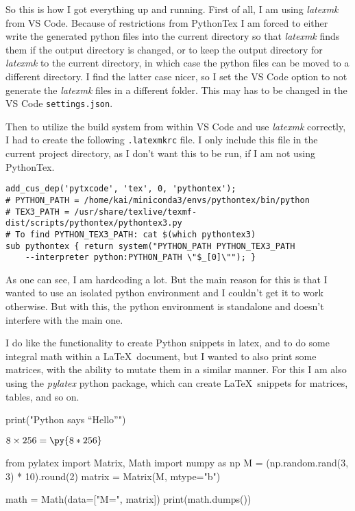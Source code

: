 \documentclass{article}
\newcommand{\pymultiply}[2]{\py{#1*#2}}
\begin{document}
So this is how I got everything up and running.
First of all, I am using \emph{latexmk} from VS Code.
Because of restrictions from PythonTex I am forced to
either write the generated python files into the current
directory so that \emph{latexmk} finds them if the output directory
is changed, or to keep the output directory for \emph{latexmk}
to the current directory, in which case the python files can be
moved to a different directory. I find the latter case nicer,
so I set the VS Code option to not generate the \emph{latexmk} 
files in a different folder. This may has to be changed
in the VS Code \texttt{settings.json}.

Then to utilize the build system from within VS Code and use
\emph{latexmk} correctly, I had to create the following
\texttt{.latexmkrc} file. I only include this file in the
current project directory, as I don't want this to be run, if
I am not using PythonTex.

{\small
\begin{verbatim}
add_cus_dep('pytxcode', 'tex', 0, 'pythontex');
# PYTHON_PATH = /home/kai/miniconda3/envs/pythontex/bin/python
# TEX3_PATH = /usr/share/texlive/texmf-dist/scripts/pythontex/pythontex3.py
# To find PYTHON_TEX3_PATH: cat $(which pythontex3)
sub pythontex { return system("PYTHON_PATH PYTHON_TEX3_PATH 
    --interpreter python:PYTHON_PATH \"$_[0]\""); }
\end{verbatim}
}

As one can see, I am hardcoding a lot. But the main reason for this
is that I wanted to use an isolated python environment and
I couldn't get it to work otherwise. But with this, the
python environment is standalone and doesn't interfere with the
main one.

I do like the functionality to create Python snippets in latex, and
to do some integral math within a \LaTeX\ document, but I wanted
to also print some matrices, with the ability to mutate them
in a similar manner. For this I am also using the
\emph{pylatex} python package, which can create \LaTeX\ snippets
for matrices, tables, and so on.


\begin{pycode}
print("Python says ``Hello''")
\end{pycode}

$8 \times 256 = \pymultiply{8}{256}$

\begin{pycode}
from pylatex import Matrix, Math
import numpy as np
M = (np.random.rand(3, 3) * 10).round(2)
matrix = Matrix(M, mtype="b")

math = Math(data=["M=", matrix])
print(math.dumps())
\end{pycode}
\end{document}
